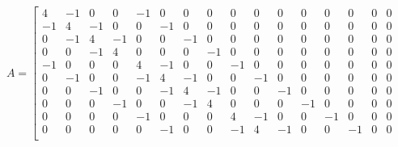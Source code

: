 $$
A = 
\left\lbrack\begin{array}{rrrr|rrrr|rrrr|rrrr}
           4&          -1&           0&           0&          -1&           0&           0&           0&           0&           0&           0&           0&           0&           0&           0&           0\\
          -1&           4&          -1&           0&           0&          -1&           0&           0&           0&           0&           0&           0&           0&           0&           0&           0\\
           0&          -1&           4&          -1&           0&           0&          -1&           0&           0&           0&           0&           0&           0&           0&           0&           0\\
           0&           0&          -1&           4&           0&           0&           0&          -1&           0&           0&           0&           0&           0&           0&           0&           0\\ \hline
          -1&           0&           0&           0&           4&          -1&           0&           0&          -1&           0&           0&           0&           0&           0&           0&           0\\
           0&          -1&           0&           0&          -1&           4&          -1&           0&           0&          -1&           0&           0&           0&           0&           0&           0\\
           0&           0&          -1&           0&           0&          -1&           4&          -1&           0&           0&          -1&           0&           0&           0&           0&           0\\
           0&           0&           0&          -1&           0&           0&          -1&           4&           0&           0&           0&          -1&           0&           0&           0&           0\\ \hline
           0&           0&           0&           0&          -1&           0&           0&           0&           4&          -1&           0&           0&          -1&           0&           0&           0\\
           0&           0&           0&           0&           0&          -1&           0&           0&          -1&           4&          -1&           0&           0&          -1&           0&           0\\

\end{array}$$
